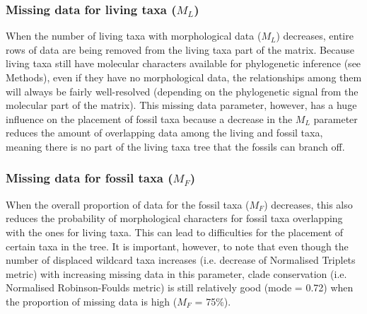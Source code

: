 \documentclass[12pt,letterpaper]{article}
\begin{document}
\subsubsection{Missing data for living taxa ($M_{L}$)}
When the number of living taxa with morphological data ($M_{L}$) decreases, entire rows of data are being removed from the living taxa part of the matrix.
Because living taxa still have molecular characters available for phylogenetic inference (see Methods), even if they have no morphological data, the relationships among them will always be fairly well-resolved (depending on the phylogenetic signal from the molecular part of the matrix).
This missing data parameter, however, has a huge influence on the placement of fossil taxa because a decrease in the $M_{L}$ parameter reduces the amount of overlapping data among the living and fossil taxa, meaning there is no part of the living taxa tree that the fossils can branch off.

\subsubsection{Missing data for fossil taxa ($M_{F}$)}
When the overall proportion of data for the fossil taxa ($M_{F}$) decreases, this also reduces the probability of morphological characters for fossil taxa overlapping with the ones for living taxa.
This can lead to difficulties for the placement of certain taxa in the tree.
It is important, however, to note that even though the number of displaced wildcard taxa increases (i.e. decrease of Normalised Triplets metric) with increasing missing data in this parameter, clade conservation (i.e. Normalised Robinson-Foulds metric) is still relatively good (mode = 0.72) when the proportion of missing data is high ($M_{F}$ = 75\%).
\end{document}
